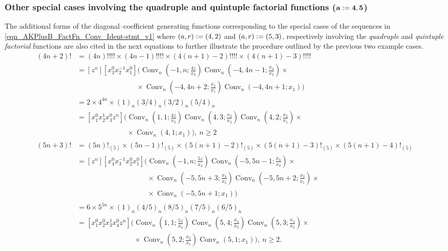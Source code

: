 \documentclass[12pt,reqno]{article}
\numberwithin{sfootnote}{section}
\numberwithin{equation}{section}
\theoremstyle{plain}
\theoremstyle{definition}
\theoremstyle{remark}
\newcommand{\defequals}{\ensuremath{\vcentcolon=}}
\newcommand{\Pochhammer}[2]{\ensuremath{\left(#1\right)_{#2}}}
\newcommand{\ConvGF}[4]{\ensuremath{\Conv_{#1}\left(#2, #3; #4\right)}}
\DeclareMathOperator{\Conv}{Conv}
\begin{document}
\subsubsection{Other special cases involving the 
               quadruple and quintuple factorial functions 
               ($\mathbf{a \defequals 4,5}$)} 
The additional forms of the diagonal--coefficient generating functions 
corresponding to the special cases of the sequences in 
\eqref{eqn_AKPlusB_FactFn_Conv_Ident-stmt_v1} where 
$(a, r) \defequals (4, 2)$ and $(a, r) \defequals (5, 3)$, respectively 
involving the \emph{quadruple} and \emph{quintuple factorial} functions 
are also cited in the next equations to further illustrate the procedure 
outlined by the previous two example cases. 
\begin{align*} 
(4n+2)! & = (4n)!!!! \times (4n-1)!!!! \times (4(n+1)-2)!!!! \times 
            (4(n+1)-3)!!!! \\ 
      & = [z^n] [x_3^{0} x_2^{-1} x_1^0] \Biggl( 
          \ConvGF{n}{-1}{n}{\frac{4z}{x_3}} 
          \ConvGF{n}{-4}{4n-1}{\frac{x_3}{x_2}} \times \\ 
      & \phantom{= [z^n] [x_3^{0} x_2^0 x_1^0] \Biggl(} \times 
          \ConvGF{n}{-4}{4n+2}{\frac{x_2}{x_1}} 
          \ConvGF{n}{-4}{4n+1}{x_1} 
          \Biggr) \\ 
      & = 
      2 \times 4^{4n} \times 
      \Pochhammer{1}{n} \Pochhammer{3/4}{n} 
      \Pochhammer{3/2}{n} \Pochhammer{5/4}{n} \\ 
      & = [x_1^0 x_2^1 x_3^0 z^n] \Biggl( 
          \ConvGF{n}{1}{1}{\frac{4z}{x_3}} 
          \ConvGF{n}{4}{3}{\frac{x_3}{x_2}} 
          \ConvGF{n}{4}{2}{\frac{x_2}{x_1}} \times \\ 
      & \phantom{= [x_1^0 x_2^1 x_3^0 z^n] \Biggl(} \times 
          \ConvGF{n}{4}{1}{x_1} 
          \Biggr),\ n \geq 2 \\ 
(5n+3)! & = (5n)!_{(5)} \times (5n-1)!_{(5)} \times (5(n+1)-2)!_{(5)} \times 
            (5(n+1)-3)!_{(5)} \times (5(n+1)-4)!_{(5)} \\ 
        & = [z^n] [x_4^0 x_3^{-1} x_2^0 x_1^0] \Biggl( 
            \ConvGF{n}{-1}{n}{\frac{5z}{x_4}} 
            \ConvGF{n}{-5}{5n-1}{\frac{x_4}{x_3}} \times \\ 
        & \phantom{= [z^n] [x_4^0 x_3^{-1} x_2^0 x_1^0] \Biggl( } \times 
            \ConvGF{n}{-5}{5n+3}{\frac{x_3}{x_2}} 
            \ConvGF{n}{-5}{5n+2}{\frac{x_2}{x_1}} \times \\ 
        & \phantom{= [z^n] [x_4^0 x_3^{-1} x_2^0 x_1^0] \Biggl( } \times 
            \ConvGF{n}{-5}{5n+1}{x_1} 
            \Biggr) \\ 
      & = 
      6 \times 5^{5n} \times 
      \Pochhammer{1}{n} \Pochhammer{4/5}{n} \Pochhammer{8/5}{n} 
      \Pochhammer{7/5}{n} \Pochhammer{6/5}{n} \\ 
      & = [x_1^0 x_2^0 x_3^1 x_4^0 z^n] \Biggl( 
          \ConvGF{n}{1}{1}{\frac{5z}{x_4}} 
          \ConvGF{n}{5}{4}{\frac{x_4}{x_3}} 
          \ConvGF{n}{5}{3}{\frac{x_3}{x_2}} \times \\ 
      & \phantom{= [x_1^0 x_2^0 x_3^1 x_4^0 z^n] \Biggl(} \times 
          \ConvGF{n}{5}{2}{\frac{x_2}{x_1}} 
          \ConvGF{n}{5}{1}{x_1} 
          \Biggr),\ n \geq 2. 
\end{align*} 
\end{document}

